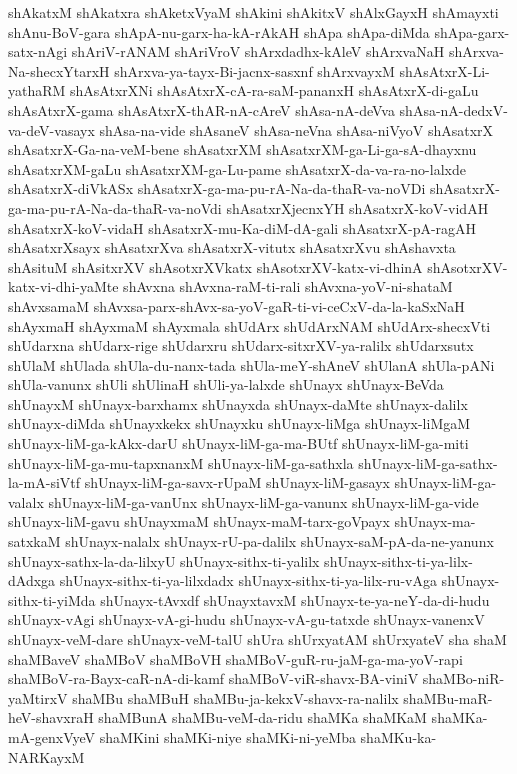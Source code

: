 {shAkatxM
shAkatxra
shAketxVyaM
shAkini
shAkitxV
shAlxGayxH
shAmayxti
shAnu-BoV-gara
shApA-nu-garx-ha-kA-rAkAH
shApa
shApa-diMda
shApa-garx-satx-nAgi
shAriV-rANAM
shAriVroV
shArxdadhx-kAleV
shArxvaNaH
shArxva-Na-shecxYtarxH
shArxva-ya-tayx-Bi-jacnx-sasxnf
shArxvayxM
shAsAtxrX-Li-yathaRM
shAsAtxrXNi
shAsAtxrX-cA-ra-saM-pananxH
shAsAtxrX-di-gaLu
shAsAtxrX-gama
shAsAtxrX-thAR-nA-cAreV
shAsa-nA-deVva
shAsa-nA-dedxV-va-deV-vasayx
shAsa-na-vide
shAsaneV
shAsa-neVna
shAsa-niVyoV
shAsatxrX
shAsatxrX-Ga-na-veM-bene
shAsatxrXM
shAsatxrXM-ga-Li-ga-sA-dhayxnu
shAsatxrXM-gaLu
shAsatxrXM-ga-Lu-pame
shAsatxrX-da-va-ra-no-lalxde
shAsatxrX-diVkASx
shAsatxrX-ga-ma-pu-rA-Na-da-thaR-va-noVDi
shAsatxrX-ga-ma-pu-rA-Na-da-thaR-va-noVdi
shAsatxrXjecnxYH
shAsatxrX-koV-vidAH
shAsatxrX-koV-vidaH
shAsatxrX-mu-Ka-diM-dA-gali
shAsatxrX-pA-ragAH
shAsatxrXsayx
shAsatxrXva
shAsatxrX-vitutx
shAsatxrXvu
shAshavxta
shAsituM
shAsitxrXV
shAsotxrXVkatx
shAsotxrXV-katx-vi-dhinA
shAsotxrXV-katx-vi-dhi-yaMte
shAvxna
shAvxna-raM-ti-rali
shAvxna-yoV-ni-shataM
shAvxsamaM
shAvxsa-parx-shAvx-sa-yoV-gaR-ti-vi-ceCxV-da-la-kaSxNaH
shAyxmaH
shAyxmaM
shAyxmala
shUdArx
shUdArxNAM
shUdArx-shecxVti
shUdarxna
shUdarx-rige
shUdarxru
shUdarx-sitxrXV-ya-ralilx
shUdarxsutx
shUlaM
shUlada
shUla-du-nanx-tada
shUla-meY-shAneV
shUlanA
shUla-pANi
shUla-vanunx
shUli
shUlinaH
shUli-ya-lalxde
shUnayx
shUnayx-BeVda
shUnayxM
shUnayx-barxhamx
shUnayxda
shUnayx-daMte
shUnayx-dalilx
shUnayx-diMda
shUnayxkekx
shUnayxku
shUnayx-liMga
shUnayx-liMgaM
shUnayx-liM-ga-kAkx-darU
shUnayx-liM-ga-ma-BUtf
shUnayx-liM-ga-miti
shUnayx-liM-ga-mu-tapxnanxM
shUnayx-liM-ga-sathxla
shUnayx-liM-ga-sathx-la-mA-siVtf
shUnayx-liM-ga-savx-rUpaM
shUnayx-liM-gasayx
shUnayx-liM-ga-valalx
shUnayx-liM-ga-vanUnx
shUnayx-liM-ga-vanunx
shUnayx-liM-ga-vide
shUnayx-liM-gavu
shUnayxmaM
shUnayx-maM-tarx-goVpayx
shUnayx-ma-satxkaM
shUnayx-nalalx
shUnayx-rU-pa-dalilx
shUnayx-saM-pA-da-ne-yanunx
shUnayx-sathx-la-da-lilxyU
shUnayx-sithx-ti-yalilx
shUnayx-sithx-ti-ya-lilx-dAdxga
shUnayx-sithx-ti-ya-lilxdadx
shUnayx-sithx-ti-ya-lilx-ru-vAga
shUnayx-sithx-ti-yiMda
shUnayx-tAvxdf
shUnayxtavxM
shUnayx-te-ya-neY-da-di-hudu
shUnayx-vAgi
shUnayx-vA-gi-hudu
shUnayx-vA-gu-tatxde
shUnayx-vanenxV
shUnayx-veM-dare
shUnayx-veM-talU
shUra
shUrxyatAM
shUrxyateV
sha
shaM
shaMBaveV
shaMBoV
shaMBoVH
shaMBoV-guR-ru-jaM-ga-ma-yoV-rapi
shaMBoV-ra-Bayx-caR-nA-di-kamf
shaMBoV-viR-shavx-BA-viniV
shaMBo-niR-yaMtirxV
shaMBu
shaMBuH
shaMBu-ja-kekxV-shavx-ra-nalilx
shaMBu-maR-heV-shavxraH
shaMBunA
shaMBu-veM-da-ridu
shaMKa
shaMKaM
shaMKa-mA-genxVyeV
shaMKini
shaMKi-niye
shaMKi-ni-yeMba
shaMKu-ka-NARKayxM
}
